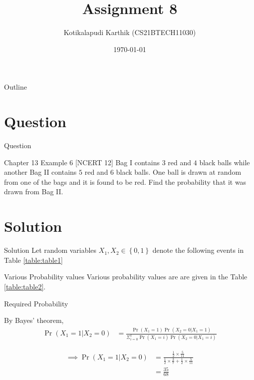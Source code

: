 \documentclass{beamer}
\title{Assignment 8}
\author{Kotikalapudi Karthik (CS21BTECH11030)}
\date{\today}
\providecommand{\pr}[1]{\ensuremath{\Pr\left(#1\right)}}
\providecommand{\cbrak}[1]{\ensuremath{\left\{#1\right\}}}
\begin{document}
\begin{frame}
    \titlepage 
\end{frame}

\logo{}


\begin{frame}{Outline}
    \tableofcontents
\end{frame}

\section{Question}
\begin{frame}{Question}
    \begin{block}{Chapter 13 Example 6 [NCERT 12]} 
        Bag I contains $3$ red and $4$ black balls while another Bag II contains $5$ red and $6$ black balls. One ball is drawn at random from one of the bags and it is found to be red. Find the probability that it was drawn from Bag II.
    \end{block}
\end{frame}

\section{Solution}
\begin{frame}{Solution}
Let random variables $X_1, X_2 \in \cbrak{0,1}$ denote the following events in Table \eqref{table:table1}
\begin{table}[ht!]
	\centering
	
	\caption{}
	\label{table:table1}	
\end{table}
\end{frame}

\begin{frame}{Various Probability values}
    Various probability values are are given in the Table \eqref{table:table2}.
	\begin{table}[ht!]
		
		\caption{}
		\label{table:table2}	
	\end{table}
\end{frame}

\begin{frame}{Required Probability}
   \begin{block}{By Bayes' theorem,}
   \begin{align}
    \pr{X_1=1|X_2=0}&= \frac{\pr{X_1=1}\pr{X_2=0|X_1=1}}{\Sigma^{1}_{i=0}\pr{X_1=i}\pr{X_2=0|X_1=i}}
    \end{align}
    \end{block}
    \begin{align}
        \implies \pr{X_1=1|X_2=0}&= \frac{\frac{1}{2} \times \frac{5}{11}}{\frac{1}{2} \times \frac{3}{7} + \frac{1}{2} \times \frac{5}{11}}
        \\
        &= \frac{35}{68}
    \end{align}
\end{frame}
\end{document}
